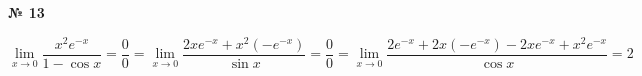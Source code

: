 \documentclass{article}
\begin{document}
\textbf{№ 13} 

$$ \lim\limits_{x\to 0} \frac{x^2e^{-x}}{1-\cos{x}}
= \frac{0}{0}
= \lim\limits_{x\to 0} \frac{2xe^{-x}+x^2(-e^{-x})}{\sin{x}}
= \frac{0}{0}
= \lim\limits_{x\to 0} \frac{2e^{-x}+2x(-e^{-x})-2xe^{-x}+x^2e^{-x}}{\cos{x}}
= 2 $$
\end{document}
